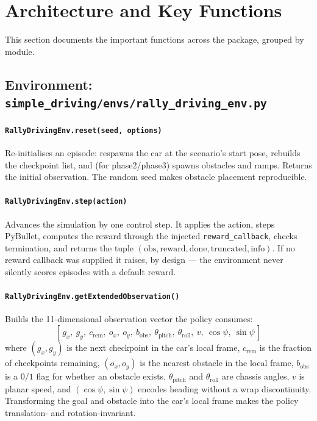 \documentclass[11pt]{article}
\begin{document}
\section{Architecture and Key Functions}

This section documents the important functions across the package, grouped by
module.

\subsection{Environment: \texttt{simple\_driving/envs/rally\_driving\_env.py}}

\paragraph{\texttt{RallyDrivingEnv.reset(seed, options)}}
Re-initialises an episode: respawns the car at the scenario's start pose,
rebuilds the checkpoint list, and (for phase2/phase3) spawns obstacles and
ramps. Returns the initial observation. The random seed makes obstacle
placement reproducible.

\paragraph{\texttt{RallyDrivingEnv.step(action)}}
Advances the simulation by one control step. It applies the action, steps
PyBullet, computes the reward through the injected
\texttt{reward\_callback}, checks termination, and returns the tuple
$(\text{obs}, \text{reward}, \text{done}, \text{truncated}, \text{info})$.
If no reward callback was supplied it raises, by design --- the environment
never silently scores episodes with a default reward.

\paragraph{\texttt{RallyDrivingEnv.getExtendedObservation()}}
Builds the 11-dimensional observation vector the policy consumes:
\[
[\, g_x,\ g_y,\ c_{\text{rem}},\ o_x,\ o_y,\ b_{\text{obs}},\
      \theta_{\text{pitch}},\ \theta_{\text{roll}},\ v,\
      \cos\psi,\ \sin\psi \,]
\]
where $(g_x,g_y)$ is the next checkpoint in the car's local frame,
$c_{\text{rem}}$ is the fraction of checkpoints remaining, $(o_x,o_y)$ is the
nearest obstacle in the local frame, $b_{\text{obs}}$ is a $0/1$ flag for
whether an obstacle exists, $\theta_{\text{pitch}}$ and $\theta_{\text{roll}}$
are chassis angles, $v$ is planar speed, and $(\cos\psi,\sin\psi)$ encodes
heading without a wrap discontinuity. Transforming the goal and obstacle into
the car's local frame makes the policy translation- and rotation-invariant.
\end{document}

